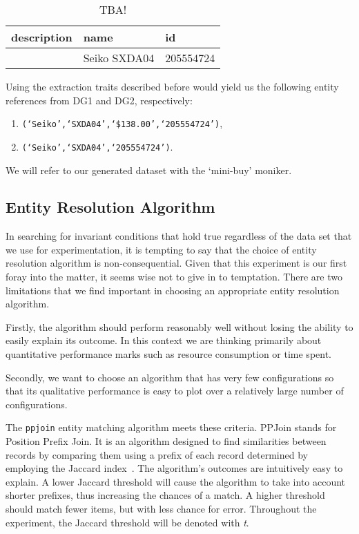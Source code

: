 \begin{table}[ht]
    \setlength\tabcolsep{5pt}
    \begin{tabular}[b]{|l|l|l|}
        \hline
        description&name&id \\
        \hline
        &Seiko SXDA04&205554724 \\
        \hline
    \end{tabular}
    \label{tab:dg2-record}
    \caption{TBA!}
\end{table}

Using the extraction traits described before would yield us the
following entity references from DG1 and DG2, respectively:
\begin{enumerate}
    \item \texttt{(`Seiko',`SXDA04',`\$138.00',`205554724')},
    \item \texttt{(`Seiko',`SXDA04',`205554724')}.
\end{enumerate}

We will refer to our generated dataset with the `mini-buy' moniker.

\subsection{Entity Resolution Algorithm}\label{subsec:entity-resolution-algorithm}

In searching for invariant conditions that hold true regardless of the data set
that we use for experimentation, it is tempting to say that the choice of entity
resolution algorithm is non-consequential.
Given that this experiment is our first foray into the matter, it seems wise not
to give in to temptation.
There are two limitations that we find important in choosing an appropriate
entity resolution algorithm.

Firstly, the algorithm should perform reasonably well without losing the ability
to easily explain its outcome.
In this context we are thinking primarily about quantitative performance marks
such as resource consumption or time spent.

Secondly, we want to choose an algorithm that has very few configurations so
that its qualitative performance is easy to plot over a relatively large  number
of configurations.

The \texttt{ppjoin}\cite{ppjoin} entity matching algorithm meets these criteria.
PPJoin stands for Position Prefix Join.
It is an algorithm designed to find similarities between records by comparing
them using a prefix of each record determined by employing the Jaccard
index~\cite{jaccard1912,finley1996}.
The algorithm's outcomes are intuitively easy to explain.
A lower Jaccard threshold will cause the algorithm to take into account shorter
prefixes, thus increasing the chances of a match.
A higher threshold should match fewer items, but with less chance for error.
Throughout the experiment, the Jaccard threshold will be denoted with \textit{t}.

